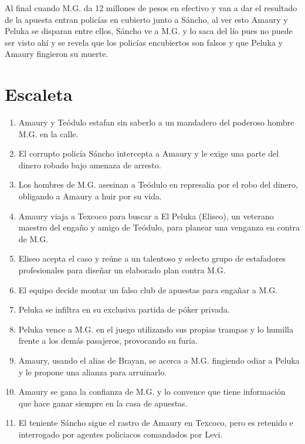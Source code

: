 Al final cuando M.G. da 12 millones de pesos en efectivo y van a dar el resultado de la apuesta entran policías en cubierto junto a Sáncho, al ver esto Amaury y Peluka se disparan entre ellos, Sáncho ve a M.G. y lo saca del lío pues no puede ser visto ahí y se revela que los policías encubiertos son falsos y que Peluka y Amaury fingieron su muerte.



\setlength{\parskip}{0pt}
 
\pagebreak
\section{ Escaleta}
\begin{enumerate}
    \item Amaury y Teódulo estafan sin saberlo a un mandadero del poderoso hombre M.G. en la calle.
    \item El corrupto policía Sáncho  intercepta a Amaury y le exige una parte del dinero robado bajo amenaza de arresto.
    \item Los hombres de M.G. asesinan a Teódulo en represalia por el robo del dinero, obligando a Amaury  a huir por su vida.
    \item Amaury  viaja a Texcoco para buscar a El Peluka (Eliseo), un veterano maestro del engaño y amigo de Teódulo, para planear una venganza en contra de M.G.
    \item Eliseo acepta el caso y reúne a un talentoso y selecto grupo de estafadores profesionales para diseñar un elaborado plan contra M.G.
    \item El equipo decide montar un falso club de apuestas para engañar a M.G.
    \item Peluka se infiltra en su exclusiva partida de póker privada.
    \item Peluka vence a M.G. en el juego utilizando sus propias trampas y lo humilla frente a los demás pasajeros, provocando su furia.
    \item Amaury, usando el alias de Brayan, se acerca a M.G. fingiendo odiar a Peluka y le propone una alianza para arruinarlo.
    \item Amaury se gana la confianza de M.G. y lo convence que tiene información que hace ganar siempre en la casa de apuestas.
    \item El teniente Sáncho sigue el rastro de Amaury  en Texcoco, pero es retenido e interrogado por agentes policiacos comandados por Levi.

\end{enumerate}

